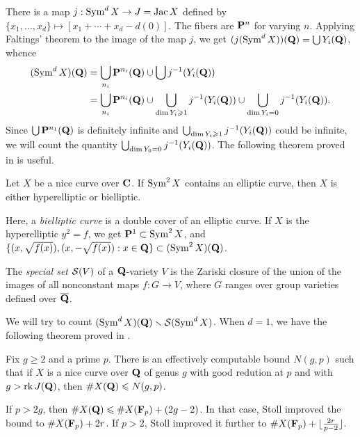 There is a map $j:\operatorname{Sym}^d X\to J=\operatorname{Jac} X$ defined by 
$\{x_1,\dots,x_d\}\mapsto [x_1+\cdots + x_d - d(0)]$. The fibers are $\mathbf{P}^n$ 
for varying $n$. Applying Faltings' theorem to the image of the map $j$, we 
get $(j(\operatorname{Sym}^d X))(\mathbf{Q}) = \bigcup Y_i(\mathbf{Q})$, 
whence 
\begin{align*}
  (\operatorname{Sym}^d X)(\mathbf{Q}) 
    &= \bigcup_{n_i} \mathbf{P}^{n_i}(\mathbf{Q}) \cup \bigcup j^{-1}(Y_i(\mathbf{Q})) \\
    &= \bigcup_{n_i} \mathbf{P}^{n_i}(\mathbf{Q}) \cup \bigcup_{\dim Y_i\geqslant 1} j^{-1}(Y_i(\mathbf{Q})) \cup \bigcup_{\dim Y_i=0} j^{-1}(Y_i(\mathbf{Q})) .
\end{align*}
Since $\bigcup \mathbf{P}^{n_1}(\mathbf{Q})$ is definitely infinite and 
$\bigcup_{\dim Y_i\geqslant 1} j^{-1}(Y_i(\mathbf{Q}))$ could be infinite, we will 
count the quantity $\bigcup_{\dim Y_0=0} j^{-1}(Y_i(\mathbf{Q}))$. The following 
theorem proved in \cite{hs91} is useful. 

\begin{theo}
Let $X$ be a nice curve over $\mathbf{C}$. If $\operatorname{Sym}^2 X$ contains an elliptic 
curve, then $X$ is either hyperelliptic or bielliptic. 
\end{theo}

Here, a \emph{bielliptic curve} is a double cover of an elliptic curve. If 
$X$ is the hyperelliptic $y^2=f$, we get $\mathbf{P}^1\subset \operatorname{Sym}^2 X$, and 
$\{(x,\sqrt{f(x)}),(x,-\sqrt{f(x)}):x\in \mathbf{Q}\}\subset (\operatorname{Sym}^2 X)(\mathbf{Q})$. 

\begin{defi}
The \emph{special set} $\mathcal{S}(V)$ of a $\mathbf{Q}$-variety $V$ is the Zariski closure 
of the union of the images of all nonconstant maps $f:G\to V$, where $G$ ranges 
over group varieties defined over $\overline{\mathbf{Q}}$. 
\end{defi}

We will try to count $(\operatorname{Sym}^d X)(\mathbf{Q})\smallsetminus \mathcal{S}(\operatorname{Sym}^d X)$. 
When $d=1$, we have the following theorem proved in \cite{c85}. 

\begin{theo}[Coleman]
Fix $g\geqslant 2$ and a prime $p$. There is an effectively computable bound 
$N(g,p)$ such that if $X$ is a nice curve over $\mathbf{Q}$ of genus $g$ with good 
redution at $p$ and with $g>\operatorname{rk} J(\mathbf{Q})$, then $\# X(\mathbf{Q})\leqslant N(g,p)$. 
\end{theo}

If $p>2 g$, then $\# X(\mathbf{Q})\leqslant \# X(\mathbf{F}_p)+(2 g-2)$. In that case, Stoll 
improved the bound to $\# X(\mathbf{F}_p)+2r$. If $p>2$, Stoll improved it further 
to $\# X(\mathbf{F}_p) + \lfloor\frac{2r}{p-2}\rfloor$. 

